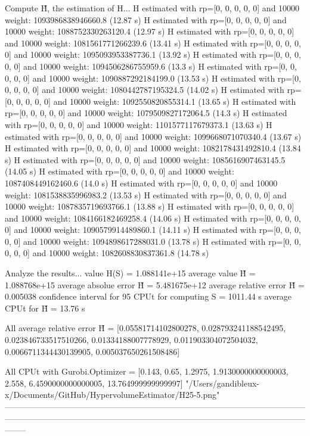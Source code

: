 Compute H̃, the estimation of H...
  H estimated with rp=[0, 0, 0, 0, 0] and 10000 weight:  1093986838946660.8  (12.87 s)
  H estimated with rp=[0, 0, 0, 0, 0] and 10000 weight:  1088752330263120.4  (12.97 s)
  H estimated with rp=[0, 0, 0, 0, 0] and 10000 weight:  1081561771266239.6  (13.41 s)
  H estimated with rp=[0, 0, 0, 0, 0] and 10000 weight:  1095093953387736.1  (13.92 s)
  H estimated with rp=[0, 0, 0, 0, 0] and 10000 weight:  1094506286755959.6  (13.3 s)
  H estimated with rp=[0, 0, 0, 0, 0] and 10000 weight:  1090887292184199.0  (13.53 s)
  H estimated with rp=[0, 0, 0, 0, 0] and 10000 weight:  1080442787195324.5  (14.02 s)
  H estimated with rp=[0, 0, 0, 0, 0] and 10000 weight:  1092550820855314.1  (13.65 s)
  H estimated with rp=[0, 0, 0, 0, 0] and 10000 weight:  1079509827172064.5  (14.3 s)
  H estimated with rp=[0, 0, 0, 0, 0] and 10000 weight:  1101577117679373.1  (13.63 s)
  H estimated with rp=[0, 0, 0, 0, 0] and 10000 weight:  1099668071070340.4  (13.67 s)
  H estimated with rp=[0, 0, 0, 0, 0] and 10000 weight:  1082178431492810.4  (13.84 s)
  H estimated with rp=[0, 0, 0, 0, 0] and 10000 weight:  1085616907463145.5  (14.05 s)
  H estimated with rp=[0, 0, 0, 0, 0] and 10000 weight:  1087408449162460.6  (14.0 s)
  H estimated with rp=[0, 0, 0, 0, 0] and 10000 weight:  1081538835996983.2  (13.53 s)
  H estimated with rp=[0, 0, 0, 0, 0] and 10000 weight:  1087835719693766.1  (13.88 s)
  H estimated with rp=[0, 0, 0, 0, 0] and 10000 weight:  1084166182469258.4  (14.06 s)
  H estimated with rp=[0, 0, 0, 0, 0] and 10000 weight:  1090579914489860.1  (14.11 s)
  H estimated with rp=[0, 0, 0, 0, 0] and 10000 weight:  1094898617288031.0  (13.78 s)
  H estimated with rp=[0, 0, 0, 0, 0] and 10000 weight:  1082608830837361.8  (14.78 s)

Analyze the results...
  value H(S)                  = 1.088141e+15 
  average value H̃             = 1.088768e+15 
  average absolue error H̃     = 5.481675e+12 
  average relative error H̃    = 0.005038 
  confidence interval for 95%
  CPUt for computing S         = 1011.44 s
  average CPUt for H̃           = 13.76 s

All average relative error H̃ = [0.05581714102800278, 0.028793241188542495, 0.023846733517510266, 0.01334188007778929, 0.011903304072504032, 0.0066711344430139905, 0.005037650261508486]

All CPUt with Gurobi.Optimizer = [0.143, 0.65, 1.2975, 1.9130000000000003, 2.558, 6.4590000000000005, 13.764999999999997]
"/Users/gandibleux-x/Documents/GitHub/HypervolumeEstimator/H25-5.png"
--------------------------------------------------------------------------------------------------------------------------------------------------------------------------------------------------------------------------------



